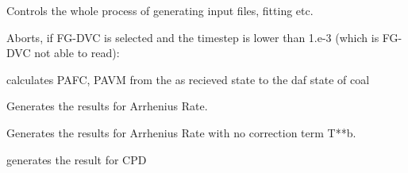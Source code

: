 \documentclass[letterpaper,10pt,english]{sphinxmanual}
\begin{document}
\begin{fulllineitems}
\label{MainProgramCode:PKP.MainProcess}
Controls the whole process of generating input files, fitting etc.

\begin{fulllineitems}
\label{MainProgramCode:PKP.MainProcess.CheckFGdt}
Aborts, if FG-DVC is selected and the timestep is lower than 1.e-3 (which is FG-DVC not able to read):

\end{fulllineitems}


\begin{fulllineitems}
\label{MainProgramCode:PKP.MainProcess.DAF}
calculates PAFC, PAVM  from the as recieved state to the daf state of coal

\end{fulllineitems}


\begin{fulllineitems}
\label{MainProgramCode:PKP.MainProcess.MakeResults_Arrh}
Generates the results for Arrhenius Rate.

\end{fulllineitems}


\begin{fulllineitems}
\label{MainProgramCode:PKP.MainProcess.MakeResults_ArrhNoB}
Generates the results for Arrhenius Rate with no correction term T**b.

\end{fulllineitems}


\begin{fulllineitems}
\label{MainProgramCode:PKP.MainProcess.MakeResults_CPD}
generates the result for CPD


\end{fulllineitems}
\end{fulllineitems}
\end{document}
